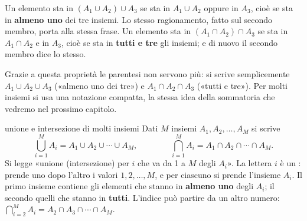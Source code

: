 \begin{dimostrazione}
 Un elemento sta in $(A_1 \cup A_2) \cup A_3$ se sta in $A_1 \cup A_2$ oppure in $A_3$, cioè se sta in
\textbf{almeno uno} dei tre insiemi. Lo stesso ragionamento, fatto sul secondo membro, porta alla stessa frase.
 Un elemento sta in $(A_1 \cap A_2) \cap A_3$ se sta in $A_1 \cap A_2$ e in $A_3$, cioè se sta in
\textbf{tutti e tre} gli insiemi; e di nuovo il secondo membro dice lo stesso.
\end{dimostrazione}

Grazie a questa proprietà le parentesi non servono più: si scrive semplicemente $A_1 \cup A_2 \cup A_3$ («almeno uno
dei tre») e $A_1 \cap A_2 \cap A_3$ («tutti e tre»). Per molti insiemi si usa una notazione compatta, la stessa idea
della sommatoria che vedremo nel prossimo capitolo.

\begin{richiamo}{unione e intersezione di molti insiemi}
Dati $M$ insiemi $A_1, A_2, \ldots, A_M$ si scrive
\[
  \bigcup_{i=1}^{M} A_i = A_1 \cup A_2 \cup \cdots \cup A_M ,
  \qquad\qquad
  \bigcap_{i=1}^{M} A_i = A_1 \cap A_2 \cap \cdots \cap A_M .
\]
Si legge «unione (intersezione) per $i$ che va da 1 a $M$ degli $A_i$». La lettera $i$ è un : prende uno
dopo l'altro i valori $1, 2, \ldots, M$, e per ciascuno si prende l'insieme $A_i$. Il primo insieme contiene gli
elementi che stanno in \textbf{almeno uno} degli $A_i$; il secondo quelli che stanno in \textbf{tutti}. L'indice può
partire da un altro numero: $\bigcap_{i=2}^{M} A_i = A_2 \cap A_3 \cap \cdots \cap A_M$.
\end{richiamo}


